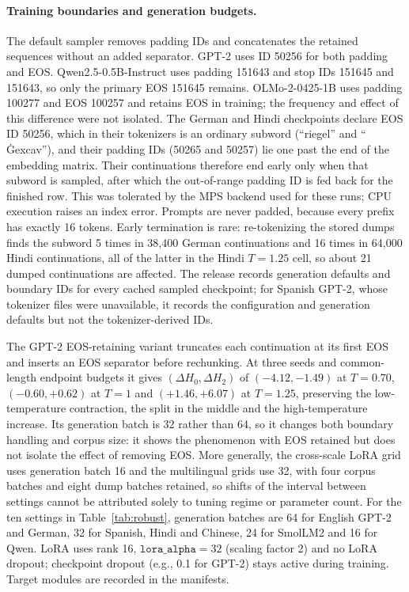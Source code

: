 \documentclass[10pt]{article}
\theoremstyle{plain}
\theoremstyle{definition}
\begin{document}
\paragraph{Training boundaries and generation budgets.} The default sampler removes padding IDs and
concatenates the retained sequences without an added separator. GPT-2 uses ID 50256 for both
padding and EOS. Qwen2.5-0.5B-Instruct uses padding 151643 and stop IDs 151645 and 151643, so
only the primary EOS 151645 remains. OLMo-2-0425-1B uses padding 100277 and EOS 100257 and
retains EOS in training;
the frequency and effect of this difference were not isolated.
The German and Hindi checkpoints declare EOS ID 50256, which in their tokenizers is an ordinary
subword (``riegel'' and ``\,\.{G}excav''), and their padding IDs (50265 and 50257) lie one past
the end of the embedding matrix. Their continuations therefore end early only when that subword
is sampled, after which the out-of-range padding ID is fed back for the finished row. This
was tolerated by the MPS backend used for these runs; CPU execution raises an index error. Prompts are
never padded, because every prefix has exactly 16 tokens. Early termination is rare: re-tokenizing the stored
dumps finds the subword 5 times in 38,400 German continuations and 16 times in 64,000 Hindi
continuations, all of the latter in the Hindi $T=1.25$ cell, so about 21 dumped continuations are affected. The release records generation defaults and boundary IDs for every cached sampled checkpoint; for Spanish
GPT-2, whose tokenizer files were unavailable, it records the configuration and generation defaults but not
the tokenizer-derived IDs.

The GPT-2 EOS-retaining variant truncates each continuation at its first EOS and inserts an EOS
separator before rechunking. At three seeds and common-length endpoint budgets it gives
$(\Delta H_0,\Delta H_2)$ of $(-4.12,-1.49)$ at $T=0.70$, $(-0.60,+0.62)$ at $T=1$ and
$(+1.46,+6.07)$ at $T=1.25$, preserving the low-temperature contraction, the split in the middle
and the high-temperature increase. Its generation batch is 32 rather than 64, so it changes both
boundary handling and corpus size: it shows the phenomenon with EOS retained but does not isolate
the effect of removing EOS. More generally, the cross-scale LoRA grid uses generation batch 16
and the multilingual grids use 32, with four corpus batches and eight dump batches retained, so
shifts of the interval between settings cannot be attributed solely to tuning regime or parameter
count. For the ten settings in Table~\ref{tab:robust}, generation batches are 64 for English
GPT-2 and German, 32 for Spanish, Hindi and Chinese, 24 for SmolLM2 and 16 for Qwen. LoRA uses
rank 16, $\texttt{lora\_alpha}=32$ (scaling factor 2) and no LoRA dropout; checkpoint dropout
(e.g., 0.1 for GPT-2) stays active during training. Target modules are recorded in the manifests.
\end{document}
